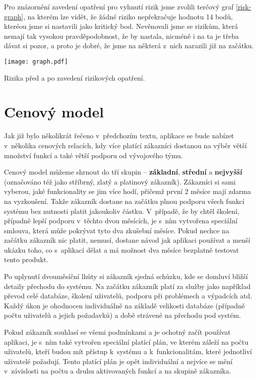 \par Pro znázornění zavedení opatření pro vyhnutí rizik jsme zvolili terčový graf \ref{risk-graph}, na kterém lze vidět, že žádné riziko nepřekračuje hodnotu 14 bodů, kteréou jsme si nastavili jako kritický bod. Nevěnovali jsme se rizikům, která nemají tak vysokou pravděpodobnost, že by nastala, nicméně i na ta je třeba dávat si pozor, a proto je dobré, že jsme na některá z~nich narazili již na začátku.

\begin{graph}[ht]
\centering
\texttt{[image: graph.pdf]}
\caption{Rizika před a po zavedení rizikových opatření.}
\label{risk-graph}
\end{graph}

\section{Cenový model}
\par Jak již bylo několikrát řečeno v~předchozím textu, aplikace se bude nabízet v~několika cenových relacích, kdy více platící zákazníci dostanou na výběr větší množství funkcí a také větší podporu od vývojového týmu.

\par Cenový model můžeme shrnout do tří skupin -- \textbf{základní}, \textbf{střední} a \textbf{nejvyšší} (označováno též jako stříbrný, zlatý a platinový zákazník). Zákazníci si sami vyberou, jaké funkcionality se jim více hodí, přičemž první 2 měsíce mají zdarma na vyzkoušení. Takže zákazník dostane na začátku plnou podporu všech funkcí systému bez nutnosti platit jakoukoliv částku. V~případě, že by chtěl školení, případně lepší podporu v~těchto dvou měsících, je s~ním vytvořena speciální smlouva, která může pokrývat tyto dva zkušební měsíce. Pokud nechce na začátku zákazník nic platit, nemusí, dostane návod jak aplikaci používat a menší ukázku toho, co s~aplikací dělat a má možnost dva měsíce bezplatně testovat tento produkt.

\par Po uplynutí dvouměsíční lhůty si zákazník sjedná schůzku, kde se domluví bližší detaily přechodu do systému. Na začátku zákazník platí za služby jako například převod celé databáze, školení uživatelů, podporu při problémech a výpadcích atd. Každý úkon je ohodnocen individuálně na základě velikosti databáze (případně počtu uživatelů a jejich požadavků) a době strávené na přechodu pod systém.

\par Pokud zákazník souhlasí se všemi podmínkami a je ochotný začít používat aplikaci, je s~ním také vytvořen speciální platící plán, ve kterém záleží na počtu uživatelů, kteří budou mít přístup k~systému a k~funkcionalitám, které jednotliví uživatelé požadují. Tento platící plán je opět individuální a nejvíce se mění v~závislosti na počtu a druhu aktivovaných funkcí a na skupině zákazníka.

